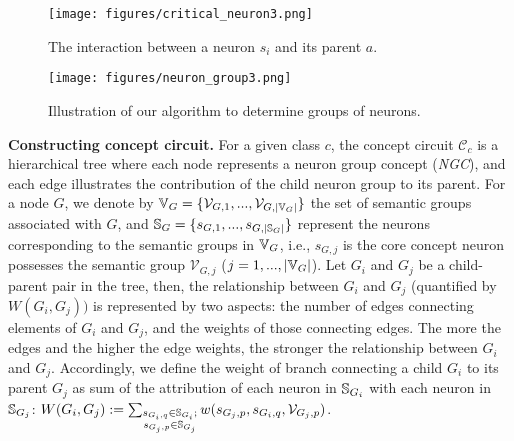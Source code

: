 \begin{figure}
    \centering
    \begin{minipage}{.35\textwidth}
        \vspace{-12mm}
        \texttt{[image: figures/critical\_neuron3.png]} 
        \vspace{3mm}
        \caption{The interaction between a neuron $s_i$ and its parent $a$.\label{fig:critical neuron}}   
    \end{minipage}
    \hfill
    \begin{minipage}{0.55\textwidth}
        \vspace{-12mm}
        \texttt{[image: figures/neuron\_group3.png]} 
        \vspace{-5mm}
        \caption{Illustration of our algorithm to determine groups of neurons.\label{fig:neuron group}}
    \end{minipage}
\vspace{-12mm}
\end{figure}


\noindent \textbf{Constructing concept circuit.} 
\label{sub_sec:constructing concept circuit}
For a given class $c$, the concept circuit $\mathcal{C}_c$ is a hierarchical tree where each node represents a neuron group concept (\emph{NGC}), and each edge illustrates the contribution of the child neuron group to its parent. 
For a node $G$, we denote by ${\mathbb{V}}_{G} = \{\mathcal{V}_{G, 1}, ..., \mathcal{V}_{G, |{\mathbb{V}}_{G}|}\}$ the set of semantic groups associated with $G$, and ${\mathbb{S}}_{G} = \{ s_{G, 1}, ..., s_{G, |{\mathbb{S}}_{G}|}\}$ represent the neurons corresponding to the semantic groups in ${\mathbb{V}}_{G}$, i.e., $s_{G, j}$ is the core concept neuron possesses the semantic group $\mathcal{V}_{G, j}$ ($j = 1, ..., |{\mathbb{V}}_{G}|$).
Let $G_i$ and $G_j$ be a child-parent pair in the tree, then, the relationship between $G_i$ and $G_j$ (quantified by $W(G_i, G_j))$ is represented by two aspects: the number of edges connecting elements of $G_i$ and $G_j$, and the weights of those connecting edges. The more the edges and the higher the edge weights, the stronger the relationship between $G_i$ and $G_j$. Accordingly, we define
the weight of branch connecting a child $G_i$ to its parent $G_j$ as sum of the attribution of each neuron in ${\mathbb{S}}_{G_i}$ with each neuron in ${\mathbb{S}}_{G_j}$: $ W(G_i, G_j) := \sum_{\substack{s_{G_i, q} \in {\mathbb{S}}_{G_i}; \\ s_{G_j,p} \in {\mathbb{S}}_{G_j}}}w(s_{G_j, p}, s_{G_i, q}, \mathcal{V}_{G_j,p})$.

